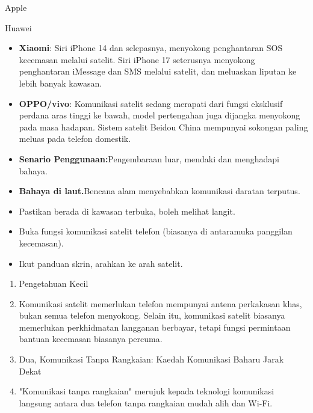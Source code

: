 


Apple


Huawei


\begin{itemize}
  \item \textbf{Xiaomi}: Siri iPhone 14 dan selepasnya, menyokong penghantaran SOS kecemasan melalui satelit. Siri iPhone 17 seterusnya menyokong penghantaran iMessage dan SMS melalui satelit, dan meluaskan liputan ke lebih banyak kawasan.
  \item \textbf{OPPO/vivo}: Komunikasi satelit sedang merapati dari fungsi eksklusif perdana aras tinggi ke bawah, model pertengahan juga dijangka menyokong pada masa hadapan. Sistem satelit Beidou China mempunyai sokongan paling meluas pada telefon domestik.
  \item \textbf{Senario Penggunaan:}Pengembaraan luar, mendaki dan menghadapi bahaya.
  \item \textbf{Bahaya di laut.}Bencana alam menyebabkan komunikasi daratan terputus.
\end{itemize}


\begin{itemize}
  \item Pastikan berada di kawasan terbuka, boleh melihat langit.
  \item Buka fungsi komunikasi satelit telefon (biasanya di antaramuka panggilan kecemasan).
  \item Ikut panduan skrin, arahkan ke arah satelit.
\end{itemize}


\begin{enumerate}
  \item Pengetahuan Kecil
  \item Komunikasi satelit memerlukan telefon mempunyai antena perkakasan khas, bukan semua telefon menyokong. Selain itu, komunikasi satelit biasanya memerlukan perkhidmatan langganan berbayar, tetapi fungsi permintaan bantuan kecemasan biasanya percuma.
  \item Dua, Komunikasi Tanpa Rangkaian: Kaedah Komunikasi Baharu Jarak Dekat
  \item "Komunikasi tanpa rangkaian" merujuk kepada teknologi komunikasi langsung antara dua telefon tanpa rangkaian mudah alih dan Wi-Fi.
\end{enumerate}

